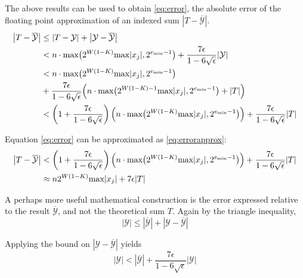     The above results can be used to obtain  \eqref{eq:error}, the absolute
    error of the floating point approximation of an indexed sum $|T - \overline{\mathcal{Y}}|$.
    \begin{align}
      \left|T - \overline{\mathcal{Y}}\right| &\leq |T - \mathcal{Y}| + \left|\mathcal{Y} - \overline{\mathcal{Y}}\right| \nonumber \\
      &< n \cdot \max\bigl(2^{W  (1 - K)}  \max|x_j|, 2^{e_{\min} - 1}\bigr) + \frac{7\epsilon}{1 - 6\sqrt\epsilon} |\mathcal{Y}| \nonumber \\
      &< n \cdot \max\bigl(2^{W  (1 - K)}  \max|x_j|, 2^{e_{\min} - 1}\bigr) \nonumber \\
      &+ \frac{7\epsilon}{1 - 6\sqrt\epsilon} \Bigl(n \cdot \max\bigl(2^{W  (1 - K) - 1}  \max|x_j|, 2^{e_{\min} - 1}\bigr) + |T|\Bigr) \nonumber \\
      &< \left(1 + \frac{7\epsilon}{1 - 6\sqrt\epsilon}\right) \Bigl(n \cdot \max\bigl(2^{W (1 - K)} \max|x_j|, 2^{e_{\min} - 1}\bigr)\Bigr) + \frac{7\epsilon}{1 - 6\sqrt\epsilon} |T|
      \label{eq:error}
    \end{align}

    Equation \eqref{eq:error} can be approximated as \eqref{eq:errorapprox}:
    \begin{align}
      \left|T - \overline{\mathcal{Y}}\right| &< \left(1 + \frac{7\epsilon}{1 - 6\sqrt\epsilon}\right) \Bigl(n \cdot \max\bigl(2^{W (1 - K)} \max|x_j|, 2^{e_{\min} - 1}\bigr)\Bigr) + \frac{7\epsilon}{1 - 6\sqrt\epsilon} |T| \nonumber \\
    &\approx n 2^{W  (1 - K)} \max|x_j| + 7  \epsilon |T|
      \label{eq:errorapprox}
    \end{align}

    A perhaps more useful mathematical construction is the error expressed
    relative to the result $\overline{\mathcal{Y}}$, and not the theoretical
    sum $T$. Again by the triangle inequality,
    \begin{equation*}
      |\mathcal{Y}| \leq \left|\overline{\mathcal{Y}}\right| + \left|\mathcal{Y} - \overline{\mathcal{Y}}\right|
    \end{equation*}

    Applying the bound on $|\mathcal{Y} - \overline{\mathcal{Y}}|$ yields
    \begin{equation*}
      |\mathcal{Y}| < \left|\overline{\mathcal{Y}}\right| + \frac{7\epsilon}{1 - 6\sqrt\epsilon}|\mathcal{Y}|
    \end{equation*}

